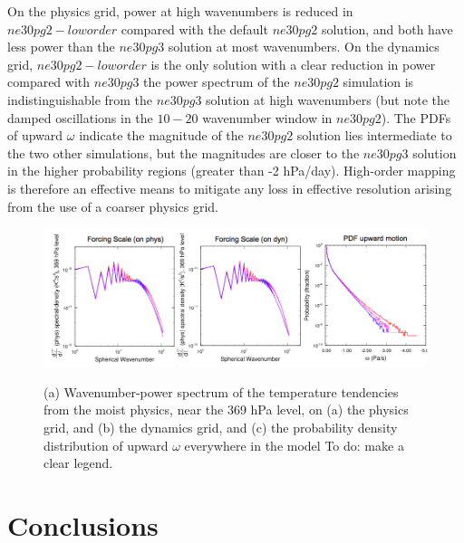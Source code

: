 \documentclass{agujournal}
\begin{document}
On the physics grid, power at high wavenumbers is reduced in $ne30pg2-loworder$ compared with the default $ne30pg2$ solution, and both have less power than the $ne30pg3$ solution at most wavenumbers. On the dynamics grid, $ne30pg2-loworder$ is the only solution with a clear reduction in power compared with $ne30pg3$ \textemdash the power spectrum of the $ne30pg2$ simulation is indistinguishable from the $ne30pg3$ solution at high wavenumbers (but note the damped oscillations in the $10-20$ wavenumber window in $ne30pg2$). The PDFs of upward $\omega$ indicate the magnitude of the $ne30pg2$ solution lies intermediate to the two other simulations, but the magnitudes are closer to the $ne30pg3$ solution in the higher probability regions (greater than -2 hPa/day). High-order mapping is therefore an effective means to mitigate any loss in effective resolution arising from the use of a coarser physics grid.

\begin{figure}[t]
\begin{center}
\noindent\includegraphics[width=30pc,angle=0]{figs/loworder-panel.png}\\
\end{center}
\caption{(a) Wavenumber-power spectrum of the temperature tendencies from the moist physics, near the 369 hPa level, on (a) the physics grid, and (b) the dynamics grid, and (c) the probability density distribution of upward $\omega$ everywhere in the model {\color{red}To do: make a clear legend.}}
\label{fig:loworder}
\end{figure}


\section{Conclusions}




\end{document}
